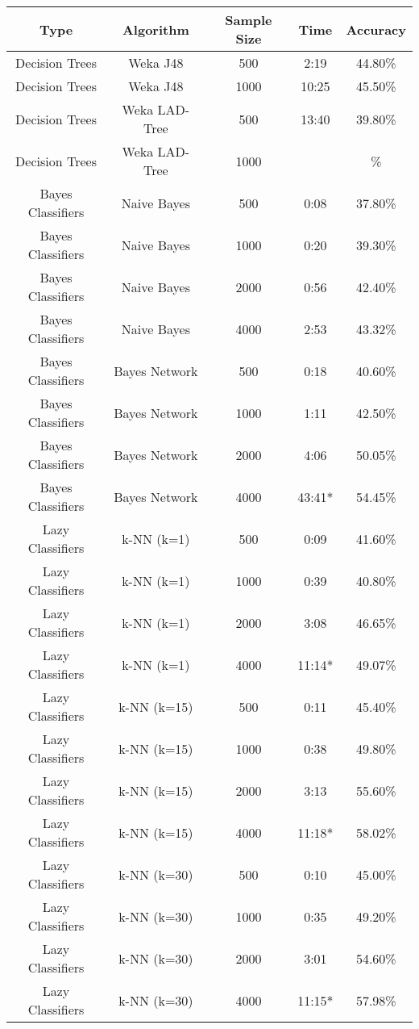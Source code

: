 \begin{tabular}{|c|c|c|c|c|}
\hline
Type     &       Algorithm    & Sample Size &  Time &  Accuracy   \\
\hline
\hline
Decision Trees & Weka J48      &   500  &   2:19  &    44.80\%  \\
Decision Trees & Weka J48      &  1000  &  10:25  &    45.50\%  \\
Decision Trees & Weka LAD-Tree &   500  &  13:40  &    39.80\%  \\
Decision Trees & Weka LAD-Tree &  1000  &         &         \%  \\

Bayes Classifiers & Naive Bayes &   500  &   0:08  &    37.80\%  \\
Bayes Classifiers & Naive Bayes &  1000  &   0:20  &    39.30\%  \\
Bayes Classifiers & Naive Bayes &  2000  &   0:56  &    42.40\%  \\
Bayes Classifiers & Naive Bayes &  4000  &   2:53  &    43.32\%  \\

Bayes Classifiers & Bayes Network &   500  &  0:18  &   40.60\%  \\
Bayes Classifiers & Bayes Network &  1000  &  1:11  &   42.50\%  \\
Bayes Classifiers & Bayes Network &  2000  &  4:06  &   50.05\%  \\
Bayes Classifiers & Bayes Network &  4000  & 43:41* &   54.45\%  \\

Lazy Classifiers & k-NN (k=1) &   500  &   0:09  &    41.60\%  \\
Lazy Classifiers & k-NN (k=1) &  1000  &   0:39  &    40.80\%  \\
Lazy Classifiers & k-NN (k=1) &  2000  &   3:08  &    46.65\%  \\
Lazy Classifiers & k-NN (k=1) &  4000  &  11:14* &    49.07\%  \\

Lazy Classifiers & k-NN (k=15) &   500  &   0:11  &    45.40\%  \\
Lazy Classifiers & k-NN (k=15) &  1000  &   0:38  &    49.80\%  \\
Lazy Classifiers & k-NN (k=15) &  2000  &   3:13  &    55.60\%  \\
Lazy Classifiers & k-NN (k=15) &  4000  &  11:18* &    58.02\%  \\

Lazy Classifiers & k-NN (k=30) &   500  &   0:10  &    45.00\%  \\
Lazy Classifiers & k-NN (k=30) &  1000  &   0:35  &    49.20\%  \\
Lazy Classifiers & k-NN (k=30) &  2000  &   3:01  &    54.60\%  \\
Lazy Classifiers & k-NN (k=30) &  4000  &  11:15* &    57.98\%  \\


\end{tabular}

